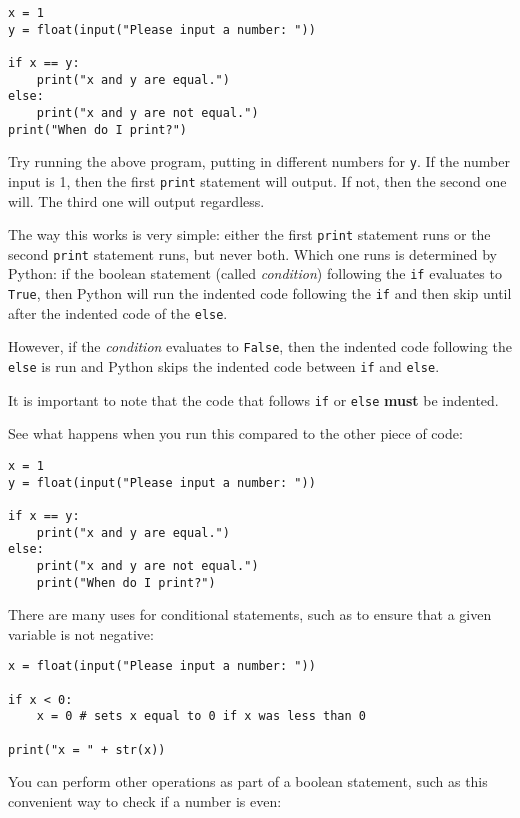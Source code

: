 \documentclass[11pt,hidelinks]{article}
\begin{document}
\begin{lstlisting}[style=python]
x = 1
y = float(input("Please input a number: "))

if x == y:
    print("x and y are equal.")
else:
    print("x and y are not equal.")
print("When do I print?")
\end{lstlisting}

Try running the above program, putting in different numbers for \lstinline{y}.
If the number input is 1, then the first \lstinline!print! statement will
output. If not, then the second one will. The third one will output regardless.

The way this works is very simple: either the first \lstinline!print! statement
runs or the second \lstinline!print! statement runs, but never both. Which one
runs is determined by Python: if the boolean statement (called \emph{condition})
following the \lstinline!if! evaluates to \lstinline!True!, then Python will
run the indented code following the \lstinline!if! and then skip until after
the indented code of the \lstinline!else!.

However, if the \emph{condition} evaluates to \lstinline!False!, then the
indented code following the \lstinline!else! is run and Python skips the
indented code between \lstinline!if! and \lstinline!else!.

It is important to note that the code that follows \lstinline!if! or
\lstinline!else! \textbf{must} be indented.

See what happens when you run this compared to the other piece of code:
\begin{lstlisting}
x = 1
y = float(input("Please input a number: "))

if x == y:
    print("x and y are equal.")
else:
    print("x and y are not equal.")
    print("When do I print?")
\end{lstlisting}

There are many uses for conditional statements, such as to ensure that a given
variable is not negative:

\begin{lstlisting}[style=python]
x = float(input("Please input a number: "))

if x < 0:
    x = 0 # sets x equal to 0 if x was less than 0

print("x = " + str(x))
\end{lstlisting}

You can perform other operations as part of a boolean statement, such as this convenient way to check if a number is even:
\end{document}
